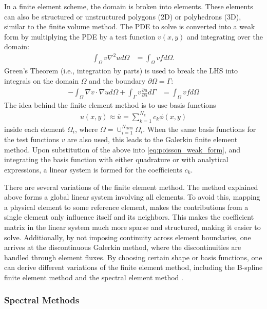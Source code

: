 In a finite element scheme, the domain is broken into elements. These elements can also be structured or unstructured polygons (2D) or polyhedrons (3D), similar to the finite volume method. The PDE to solve is converted into a weak form by multiplying the PDE by a test function $v(x,y)$ and integrating over the domain:
\begin{align}
    \int_{\Omega} v \nabla^2 u d\Omega &= \int_{\Omega} vf d\Omega.
\end{align}
Green's Theorem (i.e., integration by parts) is used to break the LHS into integrals on the domain $\Omega$ and the boundary $\partial \Omega = \Gamma$:
\begin{align}
    -\int_{\Omega} \nabla v \cdot \nabla u d\Omega + \int_{\Gamma} v \frac{\partial u}{\partial n} d\Gamma &= \int_{\Omega} vf d\Omega
    \label{eq:poisson_weak_form}
\end{align}
The idea behind the finite element method is to use basis functions
\begin{align}
    u(x,y) \approx \bar{u} = \sum_{k=1}^{N_k} c_k \phi(x,y)
\end{align}
inside each element $\Omega_i$, where $\Omega = \cup_{i = 1}^{N_{\text{elem}}} \Omega_i$. When the same basis functions for the test functions $v$ are also used, this leads to the Galerkin finite element method. Upon substitution of the above into \ref{eq:poisson_weak_form}, and integrating the basis function with either quadrature or with analytical expressions, a linear system is formed for the coefficients $c_k$.

There are several variations of the finite element method. The method explained above forms a global linear system involving all elements. To avoid this, mapping a physical element to some reference element, makes the contributions from a single element only influence itself and its neighbors. This makes the coefficient matrix in the linear system much more sparse and structured, making it easier to solve. Additionally, by not imposing continuity across element boundaries, one arrives at the discontinuous Galerkin method, where the discontinuities are handled through element fluxes. By choosing certain shape or basis functions, one can derive different variations of the finite element method, including the B-spline finite element method \citep{kagan1998new} and the spectral element method \citep{patera1984spectral}.

\subsubsection{Spectral Methods}

